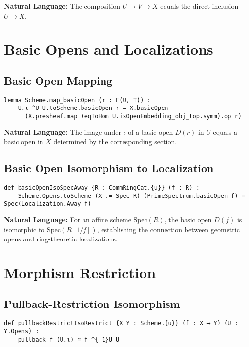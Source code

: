 \documentclass{article}
\theoremstyle{definition}
\begin{document}
\textbf{Natural Language:} The composition $U \to V \to X$ equals the direct inclusion $U \to X$.

\section{Basic Opens and Localizations}

\subsection{Basic Open Mapping}

\begin{lstlisting}
lemma Scheme.map_basicOpen (r : Γ(U, ⊤)) :
    U.ι ^U U.toScheme.basicOpen r = X.basicOpen
      (X.presheaf.map (eqToHom U.isOpenEmbedding_obj_top.symm).op r)
\end{lstlisting}

\textbf{Natural Language:} The image under $\iota$ of a basic open $D(r)$ in $U$ equals a basic open in $X$ determined by the corresponding section.

\subsection{Basic Open Isomorphism to Localization}

\begin{lstlisting}
def basicOpenIsoSpecAway {R : CommRingCat.{u}} (f : R) :
    Scheme.Opens.toScheme (X := Spec R) (PrimeSpectrum.basicOpen f) ≅ Spec(Localization.Away f)
\end{lstlisting}

\textbf{Natural Language:} For an affine scheme $\mathrm{Spec}(R)$, the basic open $D(f)$ is isomorphic to $\mathrm{Spec}(R[1/f])$, establishing the connection between geometric opens and ring-theoretic localizations.

\section{Morphism Restriction}

\subsection{Pullback-Restriction Isomorphism}

\begin{lstlisting}
def pullbackRestrictIsoRestrict {X Y : Scheme.{u}} (f : X ⟶ Y) (U : Y.Opens) :
    pullback f (U.ι) ≅ f ^{-1}U U
\end{lstlisting}
\end{document}
